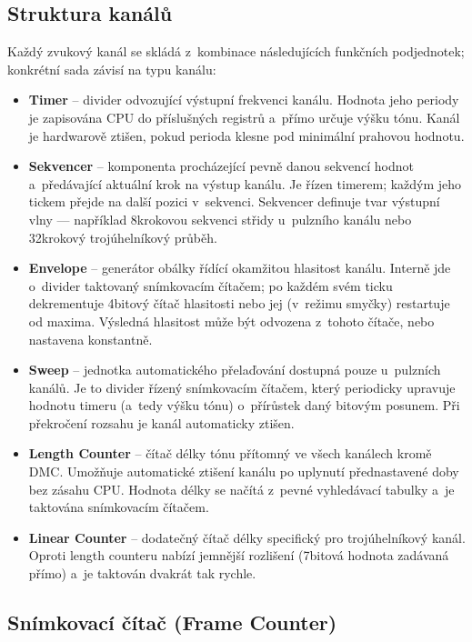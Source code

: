 \subsection{Struktura kanálů}

Každý zvukový kanál se skládá z~kombinace následujících funkčních podjednotek; konkrétní sada závisí
na typu kanálu:

\begin{itemize}
    \item \textbf{Timer} -- divider odvozující výstupní frekvenci kanálu. Hodnota jeho periody je
        zapisována CPU do příslušných registrů a~přímo určuje výšku tónu. Kanál je hardwarově
        ztišen, pokud perioda klesne pod minimální prahovou hodnotu.
    \item \textbf{Sekvencer} -- komponenta procházející pevně danou sekvencí hodnot a~předávající
        aktuální krok na výstup kanálu. Je řízen timerem; každým jeho tickem přejde na další pozici
        v~sekvenci. Sekvencer definuje tvar výstupní vlny — například 8krokovou sekvenci střidy
        u~pulzního kanálu nebo 32krokový trojúhelníkový průběh.
    \item \textbf{Envelope} -- generátor obálky řídící okamžitou hlasitost kanálu. Interně jde
        o~divider taktovaný snímkovacím čítačem; po každém svém ticku dekrementuje 4bitový čítač
        hlasitosti nebo jej (v~režimu smyčky) restartuje od maxima. Výsledná hlasitost může být
        odvozena z~tohoto čítače, nebo nastavena konstantně.
    \item \textbf{Sweep} -- jednotka automatického přelaďování dostupná pouze u~pulzních kanálů. Je
        to divider řízený snímkovacím čítačem, který periodicky upravuje hodnotu timeru (a~tedy
        výšku tónu) o~přírůstek daný bitovým posunem. Při překročení rozsahu je kanál automaticky
        ztišen.
    \item \textbf{Length Counter} -- čítač délky tónu přítomný ve všech kanálech kromě DMC. Umožňuje
        automatické ztišení kanálu po uplynutí přednastavené doby bez zásahu CPU. Hodnota délky se
        načítá z~pevné vyhledávací tabulky a~je taktována snímkovacím čítačem.
    \item \textbf{Linear Counter} -- dodatečný čítač délky specifický pro trojúhelníkový kanál.
        Oproti length counteru nabízí jemnější rozlišení (7bitová hodnota zadávaná přímo) a~je
        taktován dvakrát tak rychle.
\end{itemize}

\subsection{Snímkovací čítač (Frame Counter)}


